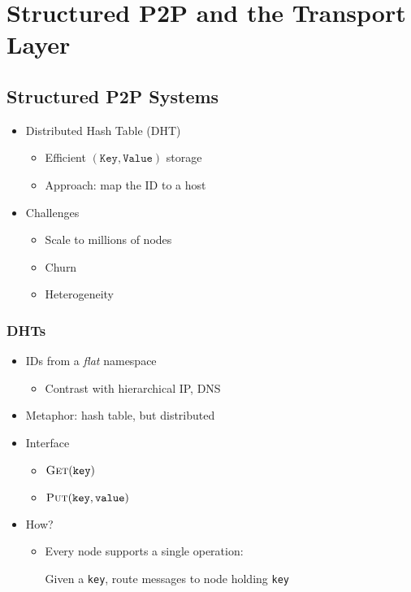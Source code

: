 \chapter{Structured P2P and the Transport Layer}
\section{Structured P2P Systems}
\begin{itemize}[nosep]
    \item Distributed Hash Table (DHT)
          \begin{itemize}[nosep]
              \item Efficient $(\texttt{Key}, \texttt{Value})$ storage
              \item Approach: map the ID to a host
          \end{itemize}
    \item Challenges
          \begin{itemize}[nosep]
              \item Scale to millions of nodes
              \item Churn
              \item Heterogeneity
          \end{itemize}
\end{itemize}
\subsection{DHTs}
\begin{itemize}[nosep]
    \item IDs from a \emph{flat} namespace
          \begin{itemize}[nosep]
              \item Contrast with hierarchical IP, DNS
          \end{itemize}
    \item Metaphor: hash table, but distributed
    \item Interface
          \begin{itemize}[nosep]
              \item $\textproc{Get}(\texttt{key})$
              \item $\textproc{Put}(\texttt{key}, \texttt{value})$
          \end{itemize}
    \item How?
          \begin{itemize}[nosep]
              \item Every node supports a single operation:

                    Given a \texttt{key}, route messages to node holding \texttt{key}
          \end{itemize}
\end{itemize}
